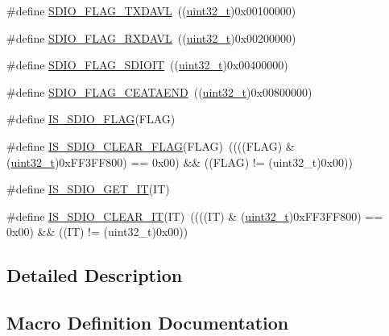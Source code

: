 \begin{DoxyCompactItemize}
\item 
\#define \hyperlink{group___s_d_i_o___flags_ga9c6620d6b16b6af19d3e14f40e688631}{S\+D\+I\+O\+\_\+\+F\+L\+A\+G\+\_\+\+T\+X\+D\+A\+VL}~((\hyperlink{_p_e___types_8h_a33594304e786b158f3fb30289278f5af}{uint32\+\_\+t})0x00100000)
\item 
\#define \hyperlink{group___s_d_i_o___flags_ga7558b354658171bb6aa1b6f1e16d8e21}{S\+D\+I\+O\+\_\+\+F\+L\+A\+G\+\_\+\+R\+X\+D\+A\+VL}~((\hyperlink{_p_e___types_8h_a33594304e786b158f3fb30289278f5af}{uint32\+\_\+t})0x00200000)
\item 
\#define \hyperlink{group___s_d_i_o___flags_gae888ec1c9885c35a5f8e01bcffe324a1}{S\+D\+I\+O\+\_\+\+F\+L\+A\+G\+\_\+\+S\+D\+I\+O\+IT}~((\hyperlink{_p_e___types_8h_a33594304e786b158f3fb30289278f5af}{uint32\+\_\+t})0x00400000)
\item 
\#define \hyperlink{group___s_d_i_o___flags_ga3c8d09a405944948e7a1c5493d49aff1}{S\+D\+I\+O\+\_\+\+F\+L\+A\+G\+\_\+\+C\+E\+A\+T\+A\+E\+ND}~((\hyperlink{_p_e___types_8h_a33594304e786b158f3fb30289278f5af}{uint32\+\_\+t})0x00800000)
\item 
\#define \hyperlink{group___s_d_i_o___flags_ga04b3c3c316e112172abacbf5e316f24a}{I\+S\+\_\+\+S\+D\+I\+O\+\_\+\+F\+L\+AG}(F\+L\+AG)
\item 
\#define \hyperlink{group___s_d_i_o___flags_ga8a093bc0b51901676fd5da7087d8ab3a}{I\+S\+\_\+\+S\+D\+I\+O\+\_\+\+C\+L\+E\+A\+R\+\_\+\+F\+L\+AG}(F\+L\+AG)~((((F\+L\+AG) \& (\hyperlink{_p_e___types_8h_a33594304e786b158f3fb30289278f5af}{uint32\+\_\+t})0x\+F\+F3\+F\+F800) == 0x00) \&\& ((\+F\+L\+A\+G) != (uint32\+\_\+t)0x00))
\item 
\#define \hyperlink{group___s_d_i_o___flags_gaef42c81f1f6250d8f9f438f4e16d1e98}{I\+S\+\_\+\+S\+D\+I\+O\+\_\+\+G\+E\+T\+\_\+\+IT}(IT)
\item 
\#define \hyperlink{group___s_d_i_o___flags_gaf829b01d8c3e9a1e4e04d39abdc8c355}{I\+S\+\_\+\+S\+D\+I\+O\+\_\+\+C\+L\+E\+A\+R\+\_\+\+IT}(IT)~((((IT) \& (\hyperlink{_p_e___types_8h_a33594304e786b158f3fb30289278f5af}{uint32\+\_\+t})0x\+F\+F3\+F\+F800) == 0x00) \&\& ((\+I\+T) != (uint32\+\_\+t)0x00))
\end{DoxyCompactItemize}


\subsection{Detailed Description}


\subsection{Macro Definition Documentation}
